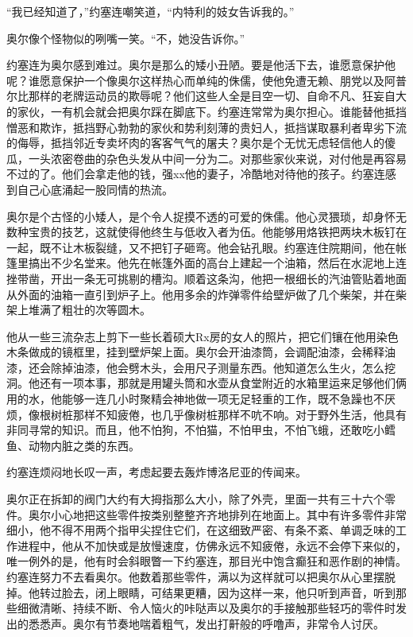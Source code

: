     “我已经知道了，”约塞连嘲笑道，“内特利的妓女告诉我的。”

    奥尔像个怪物似的咧嘴一笑。“不，她没告诉你。”

    约塞连为奥尔感到难过。奥尔是那么的矮小丑陋。要是他活下去，谁愿意保护他呢？谁愿意保护一个像奥尔这样热心而单纯的侏儒，使他免遭无赖、朋党以及阿普尔比那样的老牌运动员的欺辱呢？他们这些人全是目空一切、自命不凡、狂妄自大的家伙，一有机会就会把奥尔踩在脚底下。约塞连常常为奥尔担心。谁能替他抵挡憎恶和欺诈，抵挡野心勃勃的家伙和势利刻薄的贵妇人，抵挡谋取暴利者卑劣下流的侮辱，抵挡邻近专卖坏肉的客客气气的屠夫？奥尔是个无忧无虑轻信他人的傻瓜，一头浓密卷曲的杂色头发从中间一分为二。对那些家伙来说，对付他是再容易不过的了。他们会拿走他的钱，强xx他的妻子，冷酷地对待他的孩子。约塞连感到自己心底涌起一股同情的热流。

    奥尔是个古怪的小矮人，是个令人捉摸不透的可爱的侏儒。他心灵猥琐，却身怀无数种宝贵的技艺，这就使得他终生与低收入者为伍。他能够用烙铁把两块木板钉在一起，既不让木板裂缝，又不把钉子砸弯。他会钻孔眼。约塞连住院期间，他在帐篷里搞出不少名堂来。他先在帐篷外面的高台上建起一个油箱，然后在水泥地上连挫带凿，开出一条无可挑剔的槽沟。顺着这条沟，他把一根细长的汽油管贴着地面从外面的油箱一直引到炉子上。他用多余的炸弹零件给壁炉做了几个柴架，并在柴架上堆满了粗壮的次等圆木。
 


    他从一些三流杂志上剪下一些长着硕大Rx房的女人的照片，把它们镶在他用染色木条做成的镜框里，挂到壁炉架上面。奥尔会开油漆筒，会调配油漆，会稀释油漆，还会除掉油漆，他会劈木头，会用尺子测量东西。他知道怎么生火，怎么挖洞。他还有一项本事，那就是用罐头筒和水壶从食堂附近的水箱里运来足够他们俩用的水，他能够一连几小时聚精会神地做一项无足轻重的工作，既不急躁也不厌烦，像根树桩那样不知疲倦，也几乎像树桩那样不吭不响。对于野外生活，他具有非同寻常的知识。而且，他不怕狗，不怕猫，不怕甲虫，不怕飞蛾，还敢吃小鳕鱼、动物内脏之类的东西。

    约塞连烦闷地长叹一声，考虑起要去轰炸博洛尼亚的传闻来。

    奥尔正在拆卸的阀门大约有大拇指那么大小，除了外壳，里面一共有三十六个零件。奥尔小心地把这些零件按类别整整齐齐地排列在地面上。其中有许多零件非常细小，他不得不用两个指甲尖捏住它们，在这细致严密、有条不紊、单调乏味的工作进程中，他从不加快或是放慢速度，仿佛永远不知疲倦，永远不会停下来似的，唯一例外的是，他有时会斜眼瞥一下约塞连，那目光中饱含癫狂和恶作剧的神情。约塞连努力不去看奥尔。他数着那些零件，满以为这样就可以把奥尔从心里摆脱掉。他转过脸去，闭上眼睛，可结果更糟，因为这样一来，他只听到声音，听到那些细微清晰、持续不断、令人恼火的咔哒声以及奥尔的手接触那些轻巧的零件时发出的悉悉声。奥尔有节奏地喘着粗气，发出打鼾般的呼噜声，非常令人讨厌。

